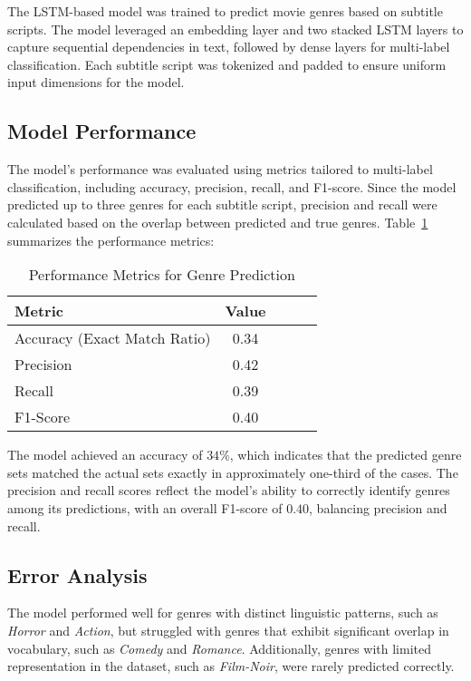 \documentclass[conference]{IEEEtran}
\begin{document}
The LSTM-based model was trained to predict movie genres based on subtitle scripts. The model leveraged an embedding layer and two stacked LSTM layers to capture sequential dependencies in text, followed by dense layers for multi-label classification. Each subtitle script was tokenized and padded to ensure uniform input dimensions for the model. 

\subsection{ Model Performance}

The model's performance was evaluated using metrics tailored to multi-label classification, including accuracy, precision, recall, and F1-score. Since the model predicted up to three genres for each subtitle script, precision and recall were calculated based on the overlap between predicted and true genres. Table~\ref{results_table} summarizes the performance metrics:

\begin{table}[h]
    \centering
    \caption{Performance Metrics for Genre Prediction}
    \begin{tabular}{|l|c|c|c|c|}
        \hline
        Metric & Value \\ 
        \hline
        Accuracy (Exact Match Ratio) & 0.34 \\ 
        Precision & 0.42 \\ 
        Recall & 0.39 \\ 
        F1-Score & 0.40 \\ 
        \hline
    \end{tabular}
    \label{results_table}
\end{table}

The model achieved an accuracy of \(34\%\), which indicates that the predicted genre sets matched the actual sets exactly in approximately one-third of the cases. The precision and recall scores reflect the model's ability to correctly identify genres among its predictions, with an overall F1-score of \(0.40\), balancing precision and recall.

\subsection{Error Analysis} 

The model performed well for genres with distinct linguistic patterns, such as \textit{Horror} and \textit{Action}, but struggled with genres that exhibit significant overlap in vocabulary, such as \textit{Comedy} and \textit{Romance}. Additionally, genres with limited representation in the dataset, such as \textit{Film-Noir}, were rarely predicted correctly.
\end{document}
